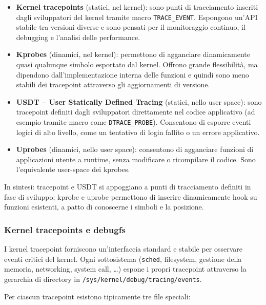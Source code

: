 \begin{itemize}
  \item \textbf{Kernel tracepoints} (statici, nel kernel): sono punti di tracciamento
        inseriti dagli sviluppatori del kernel tramite macro \texttt{TRACE\_EVENT}.
        Espongono un’API stabile tra versioni diverse e sono pensati per il monitoraggio
        continuo, il debugging e l’analisi delle performance.

  \item \textbf{Kprobes} (dinamici, nel kernel): permettono di agganciare dinamicamente
        quasi qualunque simbolo esportato dal kernel. Offrono grande flessibilità,
        ma dipendono dall’implementazione interna delle funzioni e quindi sono meno stabili
        dei tracepoint attraverso gli aggiornamenti di versione.

  \item \textbf{USDT – User Statically Defined Tracing} (statici, nello user space):
        sono tracepoint definiti dagli sviluppatori direttamente nel codice applicativo
        (ad esempio tramite macro come \texttt{DTRACE\_PROBE}). Consentono di esporre
        eventi logici di alto livello, come un tentativo di login fallito o un errore
        applicativo.

  \item \textbf{Uprobes} (dinamici, nello user space): consentono di agganciare funzioni
        di applicazioni utente a runtime, senza modificare o ricompilare il codice.
        Sono l’equivalente user-space dei kprobes.
\end{itemize}

In sintesi: tracepoint e USDT si appoggiano a punti di tracciamento definiti in
fase di sviluppo; kprobe e uprobe permettono di inserire dinamicamente hook su
funzioni esistenti, a patto di conoscerne i simboli e la posizione.

\subsubsection{Kernel tracepoints e debugfs}

I kernel tracepoint forniscono un’interfaccia standard e stabile per osservare
eventi critici del kernel. Ogni sottosistema (\texttt{sched}, filesystem,
gestione della memoria, networking, system call, \dots) espone i propri tracepoint
attraverso la gerarchia di directory in \texttt{/sys/kernel/debug/tracing/events}.

Per ciascun tracepoint esistono tipicamente tre file speciali:


